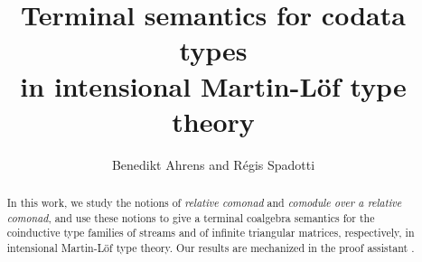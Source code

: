 \documentclass[envcountsame]{llncs}
\begin{document}
\title{Terminal semantics for codata types\\in intensional Martin-L\"of type theory}

\author{Benedikt Ahrens and R\'egis Spadotti}


\newcommand{\fat}[1]{\textbf{#1}}





\maketitle


\begin{abstract}


 In this work, we study the notions of \emph{relative comonad} and \emph{comodule over a relative comonad}, and  
 use these notions to give a terminal coalgebra semantics for the coinductive type families of streams and
 of infinite triangular matrices, respectively, in intensional Martin-L\"of type theory.
 Our results are mechanized in the proof assistant \coq.
 
    
  
  

%   
  
  
  \end{abstract}
\end{document}
